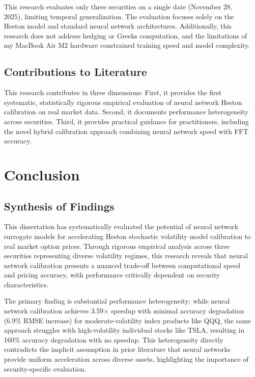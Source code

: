 \documentclass[12pt,a4paper]{article}
\begin{document}
This research evaluates only three securities on a single date (November 28, 2025), limiting temporal generalization. The evaluation focuses solely on the Heston model and standard neural network architectures. Additionally, this research does not address hedging or Greeks computation, and the limitations of my MacBook Air M2 hardware constrained training speed and model complexity.

\subsection{Contributions to Literature}

This research contributes in three dimensions: First, it provides the first systematic, statistically rigorous empirical evaluation of neural network Heston calibration on real market data. Second, it documents performance heterogeneity across securities. Third, it provides practical guidance for practitioners, including the novel hybrid calibration approach combining neural network speed with FFT accuracy.




\newpage

\section{Conclusion}

\label{sec:conclusion}

\subsection{Synthesis of Findings}

This dissertation has systematically evaluated the potential of neural network surrogate models for accelerating Heston stochastic volatility model calibration to real market option prices. Through rigorous empirical analysis across three securities representing diverse volatility regimes, this research reveals that neural network calibration presents a nuanced trade-off between computational speed and pricing accuracy, with performance critically dependent on security characteristics.

The primary finding is substantial performance heterogeneity: while neural network calibration achieves 3.59$\times$ speedup with minimal accuracy degradation (6.9\% RMSE increase) for moderate-volatility index products like QQQ, the same approach struggles with high-volatility individual stocks like TSLA, resulting in 160\% accuracy degradation with no speedup. This heterogeneity directly contradicts the implicit assumption in prior literature that neural networks provide uniform acceleration across diverse assets, highlighting the importance of security-specific evaluation.
\end{document}

